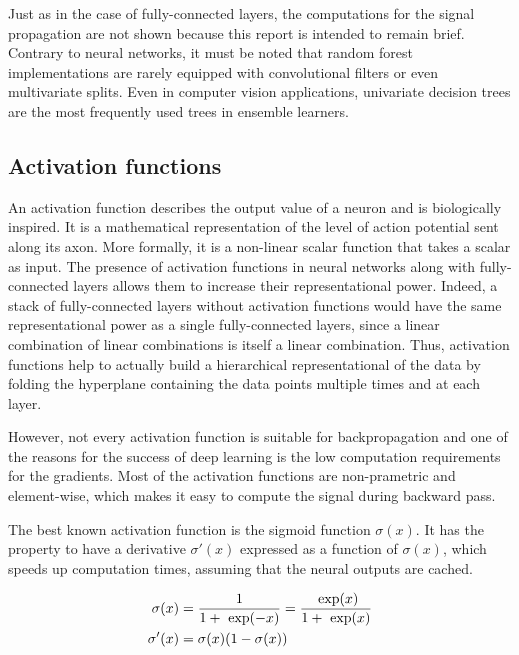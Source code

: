         Just as in the case of fully-connected layers, the computations for the signal propagation are not shown because this report is intended to remain brief.
        Contrary to neural networks, it must be noted that random forest implementations are rarely equipped with convolutional filters or even multivariate 
        splits. Even in computer vision applications, univariate decision trees are the most frequently used trees in ensemble learners.


    \subsection{Activation functions}

        An activation function describes the output value of a neuron and is biologically inspired. It is a mathematical representation
        of the level of action potential sent along its axon. More formally, it is a non-linear scalar function that takes a scalar as input.
        The presence of activation functions in neural networks along with fully-connected layers allows them to increase their representational
        power. Indeed, a stack of fully-connected layers without activation functions would have the same representational power as a single
        fully-connected layers, since a linear combination of linear combinations is itself a linear combination. Thus, activation functions
        help to actually build a hierarchical representational of the data by folding the hyperplane containing the data points multiple times
        and at each layer.

        However, not every activation function is suitable for backpropagation and one of the reasons for the success of deep learning is the low
        computation requirements for the gradients. Most of the activation functions are non-prametric and element-wise, which makes it easy
        to compute the signal during backward pass.

        The best known activation function is the sigmoid function $\sigma(x)$.
        It has the property to have a derivative $\sigma'(x)$ expressed as a function of $\sigma(x)$,
        which speeds up computation times, assuming that the neural outputs are cached.

        \begin{equation}
            \begin{split}
                \sigma(x) & = \frac{1}{1 + \text{ exp}(-x)} = \frac{\text{ exp}(x)}{1 + \text{ exp}(x)} \\
                \sigma'(x) & = \sigma(x) (1 - \sigma(x))
            \end{split}
        \end{equation}

